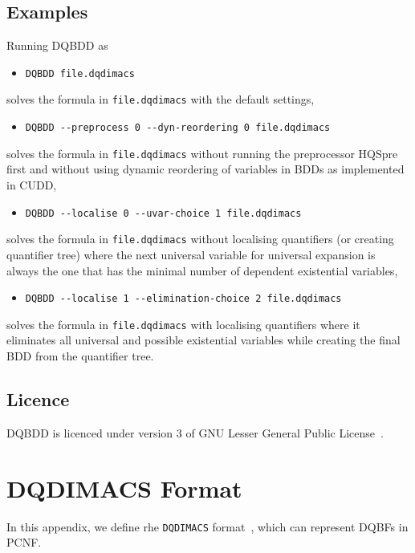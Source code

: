 \documentclass[
  digital, %
  color,
  twoside, %
  table,   %
  nolof,     %
  nolot,     %
]{fithesis3}
\theoremstyle{definition}
\theoremstyle{remark}
\newcommand{\DQDIMACS}[0]{\texttt{DQDIMACS}}
\begin{document}
\section{Examples}
Running DQBDD as
\begin{itemize}
  \item \verb|DQBDD file.dqdimacs|
\end{itemize}
solves the formula in \verb|file.dqdimacs| with the default settings,
\begin{itemize}
  \item \verb|DQBDD --preprocess 0 --dyn-reordering 0 file.dqdimacs|
\end{itemize}
solves the formula in \verb|file.dqdimacs| without running the preprocessor HQSpre first and without using dynamic reordering of variables in BDDs as implemented in CUDD,
\begin{itemize}
  \item \verb|DQBDD --localise 0 --uvar-choice 1 file.dqdimacs|
\end{itemize}
solves the formula in \verb|file.dqdimacs| without localising quantifiers (or creating quantifier tree) where the next universal variable for universal expansion is always the one that has the minimal number of dependent existential variables,
\begin{itemize}
  \item \verb|DQBDD --localise 1 --elimination-choice 2 file.dqdimacs|
\end{itemize}
solves the formula in \verb|file.dqdimacs| with localising quantifiers where it eliminates all universal and possible existential variables while creating the final BDD from the quantifier tree.

\section{Licence}
DQBDD is licenced under version 3 of GNU Lesser General Public License~\cite{lgplv3}.

\chapter{DQDIMACS Format}
\label{appendix:DQDIMACS}
In this appendix, we define rhe \DQDIMACS{} format~\cite{iDQandDQDIMACS}, which can represent DQBFs in PCNF. 
\end{document}
